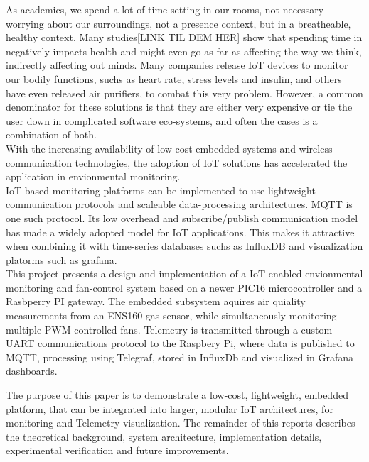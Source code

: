 As academics, we spend a lot of time setting in our rooms, not necessary worrying
about our surroundings, not a presence context, but in a breatheable, healthy
context. Many studies[LINK TIL DEM HER] show that spending time in negatively impacts
health and might even go as far as affecting the way we think, indirectly affecting
out minds. Many companies release IoT devices to monitor our bodily functions, suchs as
heart rate, stress levels and insulin, and others have even released air purifiers, to combat
this very problem. However, a common denominator for these solutions is that they are either
very expensive or tie the user down in complicated software eco-systems, and often the cases
is a combination of both.\\
With the increasing availability of low-cost embedded systems and wireless communication technologies,
the adoption of IoT solutions has accelerated the application in envionmental monitoring.\\
IoT based monitoring platforms can be implemented to use lightweight communication protocols 
and scaleable data-processing architectures. MQTT is one such protocol. Its low overhead and 
subscribe/publish communication model has made a widely adopted model for IoT applications. 
This makes it attractive when combining it with time-series databases suchs as InfluxDB and
visualization platorms such as grafana.\\

This project presents a design and implementation of a IoT-enabled envionmental monitoring 
and fan-control system based on a newer PIC16 microcontroller and a Rasbperry PI gateway.
The embedded subsystem aquires air quiality measurements from an ENS160 gas sensor, while 
simultaneously monitoring multiple PWM-controlled fans. Telemetry is transmitted through
a custom UART communications protocol to the Raspbery Pi, where data is published to MQTT, 
processing using Telegraf, stored in InfluxDb and visualized in Grafana dashboards.

The purpose of this paper is to demonstrate a low-cost, lightweight, embedded platform,
that can be integrated into larger, modular IoT architectures, for monitoring and Telemetry
visualization. The remainder of this reports describes the theoretical background, system
architecture, implementation details, experimental verification and future improvements.